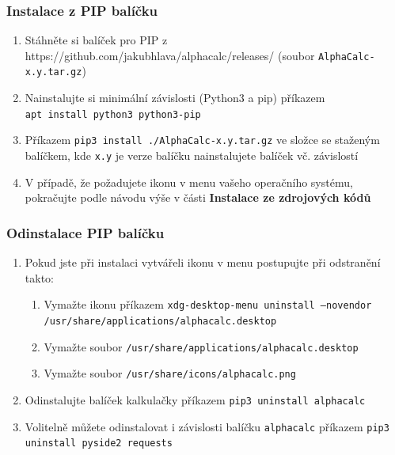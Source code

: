 \documentclass[a4paper, 12pt]{article}
\begin{document}
        \subsubsection{Instalace z PIP balíčku}
            \begin{enumerate}
                \item Stáhněte si balíček pro PIP z https://github.com/jakubhlava/alphacalc/releases/ (soubor \texttt{AlphaCalc-x.y.tar.gz})
                \item Nainstalujte si minimální závislosti (Python3 a pip) příkazem \\
                        \texttt{apt install python3 python3-pip}
                \item Příkazem \texttt{pip3 install ./AlphaCalc-x.y.tar.gz} ve složce se staženým balíčkem, kde \texttt{x.y} je verze balíčku nainstalujete balíček vč. závislostí
                \item V případě, že požadujete ikonu v menu vašeho operačního systému, pokračujte podle návodu výše v části \textbf{Instalace ze zdrojových kódů}
            \end{enumerate}
        \subsubsection{Odinstalace PIP balíčku}
            \begin{enumerate}
                \item Pokud jste při instalaci vytvářeli ikonu v menu postupujte při odstranění takto:
                    \begin{enumerate}
                        \item Vymažte ikonu příkazem \texttt{xdg-desktop-menu uninstall --novendor \\
                        /usr/share/applications/alphacalc.desktop}
                        \item Vymažte soubor \texttt{/usr/share/applications/alphacalc.desktop}
                        \item Vymažte soubor \texttt{/usr/share/icons/alphacalc.png}
                    \end{enumerate}
                \item Odinstalujte balíček kalkulačky příkazem \texttt{pip3 uninstall alphacalc}
                \item Volitelně můžete odinstalovat i závislosti balíčku \texttt{alphacalc} příkazem \texttt{pip3 uninstall pyside2 requests}
            \end{enumerate}
\end{document}
